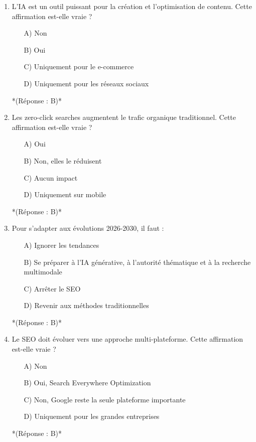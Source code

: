 \documentclass[12pt,a4paper,twoside]{report}
\begin{document}
\begin{enumerate}
    \item L'IA est un outil puissant pour la création et l'optimisation de contenu. Cette affirmation est-elle vraie ?
    \begin{itemize}
        \item[A)] Non
        \item[B)] Oui
        \item[C)] Uniquement pour le e-commerce
        \item[D)] Uniquement pour les réseaux sociaux
    \end{itemize}
    *(Réponse : B)*

    \item Les zero-click searches augmentent le trafic organique traditionnel. Cette affirmation est-elle vraie ?
    \begin{itemize}
        \item[A)] Oui
        \item[B)] Non, elles le réduisent
        \item[C)] Aucun impact
        \item[D)] Uniquement sur mobile
    \end{itemize}
    *(Réponse : B)*

    \item Pour s'adapter aux évolutions 2026-2030, il faut :
    \begin{itemize}
        \item[A)] Ignorer les tendances
        \item[B)] Se préparer à l'IA générative, à l'autorité thématique et à la recherche multimodale
        \item[C)] Arrêter le SEO
        \item[D)] Revenir aux méthodes traditionnelles
    \end{itemize}
    *(Réponse : B)*

    \item Le SEO doit évoluer vers une approche multi-plateforme. Cette affirmation est-elle vraie ?
    \begin{itemize}
        \item[A)] Non
        \item[B)] Oui, Search Everywhere Optimization
        \item[C)] Non, Google reste la seule plateforme importante
        \item[D)] Uniquement pour les grandes entreprises
    \end{itemize}
    *(Réponse : B)*


\end{enumerate}
\end{document}

